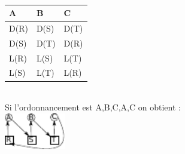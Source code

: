 \\
\begin{tabular}{l|l|l}
A & B & C \\ \hline
D(R) & D(S) & D(T) \\
D(S) & D(T) & D(R) \\
L(R) & L(S) & L(T) \\
L(S) & L(T) & L(R) \\
\end{tabular} \\
Si l'ordonnancement est A,B,C,A,C on obtient : \\
\includegraphics[width=100px]{fig38.pdf} \\

